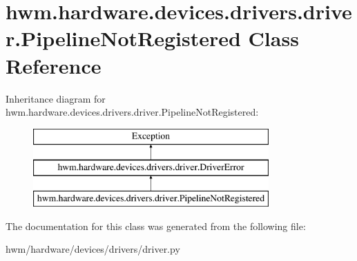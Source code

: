 \hypertarget{classhwm_1_1hardware_1_1devices_1_1drivers_1_1driver_1_1_pipeline_not_registered}{\section{hwm.\-hardware.\-devices.\-drivers.\-driver.\-Pipeline\-Not\-Registered Class Reference}
\label{classhwm_1_1hardware_1_1devices_1_1drivers_1_1driver_1_1_pipeline_not_registered}
}
Inheritance diagram for hwm.\-hardware.\-devices.\-drivers.\-driver.\-Pipeline\-Not\-Registered\-:\begin{figure}[H]
\begin{center}
\leavevmode
\includegraphics[height=3.000000cm]{classhwm_1_1hardware_1_1devices_1_1drivers_1_1driver_1_1_pipeline_not_registered}
\end{center}
\end{figure}


The documentation for this class was generated from the following file\-:\begin{DoxyCompactItemize}
\item 
hwm/hardware/devices/drivers/driver.\-py\end{DoxyCompactItemize}

